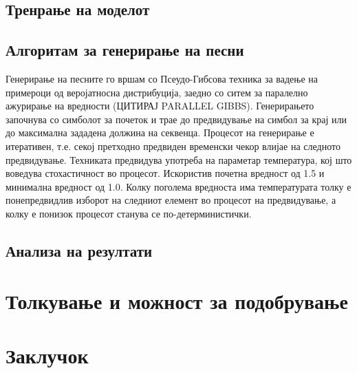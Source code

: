\section{Тренрање на моделот}



\section{Алгоритам за генерирање на песни}

Генерирање на песните го вршам со Псеудо-Гибсова техника за вадење на примероци од веројатносна дистрибуција, заедно со ситем за паралелно ажурирање на вредности (ЦИТИРАЈ PARALLEL GIBBS). Генерирањето започнува со симболот за почеток и трае до предвидување на симбол за крај или до максимална зададена должина на секвенца. Процесот на генерирање е итеративен, т.е. секој претходно предвиден временски чекор влијае на следното предвидување. Техниката предвидува употреба на параметар температура, кој што воведува стохастичност во процесот. Искористив почетна вредност од 1.5 и минимална вредност од 1.0. Колку поголема вредноста има температурата толку е понепредвидлив изборот на следниот елемент во процесот на предвидување, а колку е понизок процесот станува се по-детерминистички. 

\section{Анализа на резултати}

\chapter{Толкување и можност за подобрување}

\chapter{Заклучок}